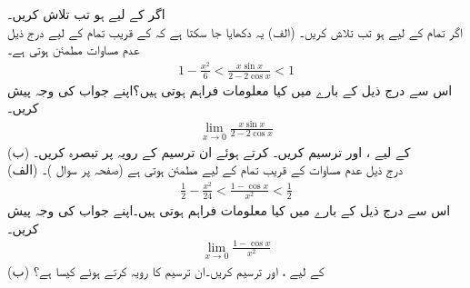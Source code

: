 
اگر  کے لیے  ہو تب  تلاش کریں۔\\
اگر تمام  کے لیے  ہو تب  تلاش کریں۔
(الف) \quad
یہ دکھایا جا سکتا ہے کہ  کے قریب تمام  کے لیے درج ذیل عدم مساوات مطمئن ہوتی ہے۔
\begin{align*}
1-\frac{x^2}{6}<\frac{x\sin x}{2-2\cos x}<1
\end{align*}
اس سے درج ذیل کے بارے میں کیا معلومات فراہم ہوتی ہیں؟اپنے جواب کی وجہ پیش کریں۔
\begin{align*}
\lim_{x\to 0} \frac{x\sin x}{2-2\cos x}
\end{align*}
(ب)\quad
{} کے لیے ،  اور  ترسیم کریں۔  کرتے ہوئے ان  ترسیم کے رویہ پر تبصرہ کریں۔\\
(الف) \quad
درج ذیل عدم مساوات  کے قریب تمام  کے لیے مطمئن ہوتی ہے (صفحہ  پر سوال )۔
\begin{align*}
\frac{1}{2}-\frac{x^2}{24}<\frac{1-\cos x}{x^2}<\frac{1}{2}
\end{align*} 
اس سے درج ذیل کے بارے میں کیا معلومات فراہم ہوتی ہیں۔اپنے جواب کی وجہ پیش کریں۔
\begin{align*}
\lim_{x\to 0}\frac{1-\cos x}{x^2}
\end{align*}
(ب)\quad
{} کے لیے ،  اور  ترسیم کریں۔ان ترسیم کا رویہ   کرتے ہوئے کیسا ہے؟


